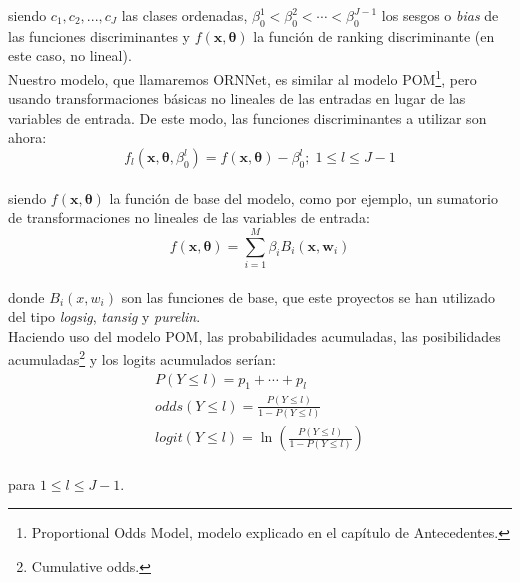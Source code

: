 		siendo $c_1, c_2, ..., c_J$ las clases ordenadas, $\beta^1_0< \beta^2_0< \cdots < \beta^{J-1}_0$ los sesgos o \textit{bias} de las funciones discriminantes y $f(\mathbf{x},{\boldsymbol \theta})$ la función de ranking discriminante (en este caso, no lineal).\\
		
		Nuestro modelo, que llamaremos ORNNet, es similar al modelo POM\footnote{Proportional Odds Model, modelo explicado en el capítulo de Antecedentes.}, pero usando transformaciones básicas no lineales de las entradas en lugar de las variables de entrada. De este modo, las funciones discriminantes a utilizar son ahora:\\
		
		\begin{equation}
			f_l(\mathbf{x},{\boldsymbol \theta},\beta^l_0)=f(\mathbf{x},{\boldsymbol \theta})-\beta^l_0;\;1\le l\le J-1
			\label{funcion_modelo}
		\end{equation}\\
		
		siendo $f(\mathbf{x},{\boldsymbol \theta})$ la función de base del modelo, como por ejemplo, un sumatorio de transformaciones no lineales de las variables de entrada:\\
		
		\begin{equation}
			f(\mathbf{x},{\boldsymbol \theta})=\sum_{i=1}^M \beta_i B_i(\mathbf{x},\mathbf{w}_i)
			\label{NL}
		\end{equation}\\
		
		donde $B_i(x,w_i)$ son las funciones de base, que este proyectos se han utilizado del tipo \textit{logsig}, \textit{tansig} y \textit{purelin}.\\
		
		Haciendo uso del modelo POM, las probabilidades acumuladas, las posibilidades acumuladas\footnote{Cumulative odds.} y los logits acumulados serían:\\
		
		\begin{eqnarray}
			P(Y\le l) = p_1+\cdots+p_l \\
			odds(Y\le l) =\frac{P(Y\le l)}{1-P(Y\le l)}\\
			logit(Y\le l)=\ln \left(\frac{P(Y\le l)}{1-P(Y\le l)}\right)
			\label{POM_odds}
		\end{eqnarray}\\
		
		para $1\le l\le J-1$.\\

